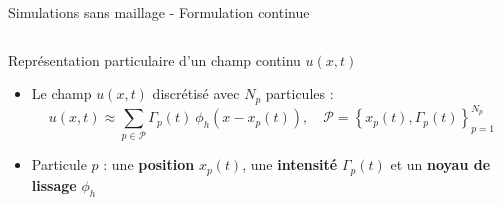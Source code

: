 \documentclass[aspectratio=169]{beamer} %
\begin{document}
\begin{frame}{Simulations sans maillage - Formulation continue}
    \begin{columns}[t]
        \begin{column}{0.7\textwidth}
            \begin{Definition}
                Représentation particulaire d'un champ continu $u(x,t)$\\
            \end{Definition}
            \begin{itemize}
                \item Le champ $u(x, t)$ discrétisé avec $N_p$ particules :
                      \begin{equation*}
                          u(x, t) \approx \sum_{p \in \mathcal P} \Gamma_p(t)~\phi_h(x - x_p(t)), \quad \mathcal P = \left\{x_p(t), \Gamma_p(t)\right\}_{p=1}^{N_p}
                      \end{equation*}
                \item Particule $p$ : une \textbf{position} $x_p(t)$, une \textbf{intensité} $\Gamma_p(t)$ et un \textbf{noyau de lissage} $\phi_h$


\end{itemize}
\end{column}
\end{columns}
\end{frame}
\end{document}
